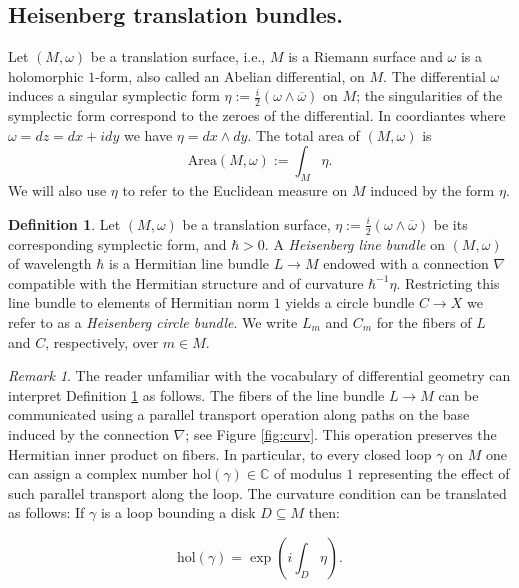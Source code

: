 \documentclass{amsart}
\theoremstyle{definition}
\newtheorem{definition}[theorem]{Definition}
\theoremstyle{remark}
\newtheorem{remark}[theorem]{Remark}
\numberwithin{equation}{section}
\newcommand{\<}{{\langle}}
\renewcommand{\>}{{\rangle}}
\begin{document}
\subsection{Heisenberg translation bundles.}\label{sec:heisenberg:bundles} Let $(M,\omega)$ be a translation surface, i.e., $M$ is a Riemann surface and $\omega$ is a holomorphic $1$-form, also called an Abelian differential, on $M$. The differential $\omega$ induces a singular symplectic form $\eta := \frac{i}{2}(\omega \wedge\overline{\omega})$ on $M$; the singularities of the symplectic form correspond to the zeroes of the differential. In coordiantes where $\omega = dz = dx+idy$ we have $\eta = dx \wedge dy$. The total area of $(M,\omega)$ is
\[
\mathrm{Area}(M,\omega):= \int_M \eta.
\]
We will also use $\eta$ to refer to the Euclidean measure on $M$ induced by the form $\eta$.
\begin{definition}
    \label{def:hcb}
    Let $(M,\omega)$ be a translation surface, $\eta := \frac{i}{2}(\omega \wedge\overline{\omega})$ be its corresponding symplectic form, and $\hbar > 0$. A \textit{Heisenberg line bundle} on $(M,\omega)$ of wavelength $\hbar$ is a Hermitian line bundle $L \to M$ endowed with a connection $\nabla$ compatible with the Hermitian structure and of curvature $\hbar^{-1}\eta$. Restricting this line bundle to elements of Hermitian norm $1$ yields a circle bundle $C \to X$ we refer to as a \textit{Heisenberg circle bundle}. We write $L_m$ and $C_m$ for the fibers of $L$ and $C$, respectively, over $m \in M$. 
\end{definition}

\begin{remark}
    The reader unfamiliar with the vocabulary of differential geometry can interpret Definition \ref{def:hcb} as follows. The fibers of the line bundle $L \to M$ can be communicated using a parallel transport operation along paths on the base induced by the connection $\nabla$; see Figure \ref{fig:curv}. This operation preserves the Hermitian inner product on fibers. In particular, to every closed loop $\gamma$ on $M$ one can assign a complex number $\mathrm{hol}(\gamma) \in \mathbb{C}$ of modulus $1$ representing the effect of such parallel transport along the loop. The curvature condition can be translated as follows: If $\gamma$ is a loop bounding a disk $D \subseteq M$ then:
    
    \begin{equation}
    \label{eq:curv}
    \mathrm{hol}(\gamma) = \exp\left(i \int_D \eta \right).
    \end{equation}
\end{remark}
\end{document}
